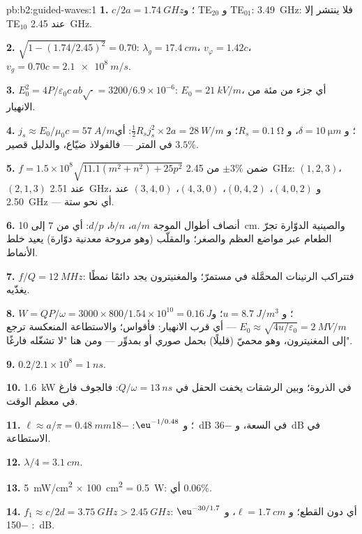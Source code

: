 \begin{solution}{pb:b2:guided-waves:1}
\textbf{1.} $c/2a = \qty{1.74}{GHz}$؛ و TE$_{20}$ و TE$_{01}$: \qty{3.49}{GHz}: فلا ينتشر إلا
TE$_{10}$ عند \qty{2.45}{GHz}.

\textbf{2.} $\sqrt{1 - (1.74/2.45)^2} = 0.70$: $\lambda_g = \qty{17.4}{cm}$، $v_\varphi = 1.42c$،
$v_g = 0.70c = \qty{2.1e8}{m/s}$.

\textbf{3.} $E_0^2 = 4P/\varepsilon_0c\,ab\sqrt{\cdot} = 3200/6.9 \times 10^{-6}$: $E_0 = \qty{21}{kV/m}$،
أي جزء من مئة من الانهيار.

\textbf{4.} $j_s \approx E_0/\mu_0c = \qty{57}{A/m}$؛ و $\delta = \qty{10}{\micro m}$، و $R_s = \qty{0.1}{\ohm}$؛
و $\tfrac12R_sj_s^2 \times 2a = \qty{28}{W/m}$: أي $3.5\%$ في المتر --- فالفولاذ ضيّاع،
والدليل قصير.

\textbf{5.} $f = 1.5 \times 10^8\sqrt{11.1(m^2 + n^2) + 25p^2}$ ضمن $\pm3\%$ من
\qty{2.45}{GHz}: $(1, 2, 3)$، $(2, 1, 3)$ عند \qty{2.51}{GHz}، و $(4, 0, 2)$، $(0, 4, 2)$،
$(4, 3, 0)$، $(3, 4, 0)$ عند \qty{2.50}{GHz} --- أي نحو ستة.

\textbf{6.} أنصاف أطوال الموجة $a/m$، $b/n$، $d/p$: أي  من $7$ إلى \qty{10}{cm}. والصينية
الدوّارة تجرّ الطعام عبر مواضع العظم والصغر؛ والمقلّب (وهو
مروحة معدنية دوّارة) يعيد خلط الأنماط.

\textbf{7.} $f/Q = \qty{12}{MHz}$: فتتراكب الرنينات المحمَّلة في
مستمرّ؛ والمغنيترون يجد دائمًا نمطًا يغذّيه.

\textbf{8.} $W = QP/\omega = 3000 \times 800/1.54 \times 10^{10} = \qty{0.16}{J}$؛ و $u = \qty{8.7}{J/m^3}$؛
و $E_0 \approx \sqrt{4u/\varepsilon_0} = \qty{2}{MV/m}$ --- أي قرب الانهيار: فأقواس؛ والاستطاعة
المنعكسة ترجع إلى المغنيترون، وهو محميّ (قليلًا) بحمل
صوري أو بمدوِّر --- ومن هنا "لا تشغّله فارغًا".

\textbf{9.} $0.2/2.1 \times 10^8 = \qty{1}{ns}$.

\textbf{10.} \qty{1.6}{kW} في الذروة؛ وبين الرشقات يخفت الحقل في
$Q/\omega = \qty{13}{ns}$: فالجوف فارغ في معظم الوقت.

\textbf{11.} $\ell \approx a/\pi = \qty{0.48}{mm}$؛ و $\eu^{-1/0.48}$: \qty{-18}{dB} في السعة،
و \qty{-36}{dB} في الاستطاعة.

\textbf{12.} $\lambda/4 = \qty{3.1}{cm}$.

\textbf{13.} \qty{5}{mW/cm^2} $\times$ \qty{100}{cm^2} = \qty{0.5}{W}: أي $0.06\%$.

\textbf{14.} $f_1 \approx c/2d = \qty{3.75}{GHz} > \qty{2.45}{GHz}$: أي دون القطع؛ و $\ell =
\qty{1.7}{cm}$، و $\eu^{-30/1.7}$: \qty{-150}{dB}.


\end{solution}
